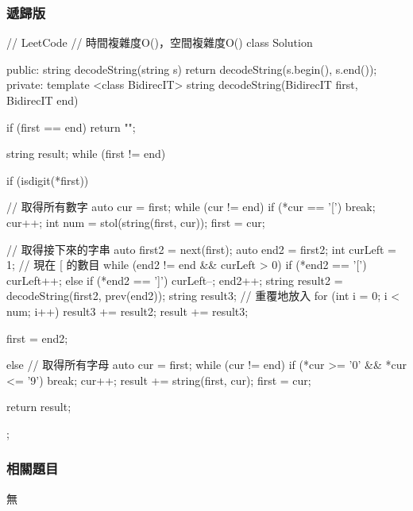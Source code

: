 \subsubsection{遞歸版}
\begin{Code}
// LeetCode
// 時間複雜度O()，空間複雜度O()
class Solution {
public:
    string decodeString(string s) {
        return decodeString(s.begin(), s.end());
    }
private:
    template <class BidirecIT>
        string decodeString(BidirecIT first, BidirecIT end)
    {
        if (first == end) return "";

        string result;
        while (first != end)
        {
            if (isdigit(*first))
            {
                // 取得所有數字
                auto cur = first;
                while (cur != end) { if (*cur == '[') break; cur++; }
                int num = stol(string(first, cur));
                first = cur;

                // 取得接下來的字串
                auto first2 = next(first);
                auto end2 = first2;
                int curLeft = 1; // 現在 [ 的數目
                while (end2 != end && curLeft > 0)
                {
                    if (*end2 == '[')
                        curLeft++;
                    else if (*end2 == ']')
                        curLeft--;
                    end2++;
                }
                string result2 = decodeString(first2, prev(end2));
                string result3;
                // 重覆地放入
                for (int i = 0; i < num; i++)
                    result3 += result2;
                result += result3;

                first = end2;
            }
            else
            {
                // 取得所有字母
                auto cur = first;
                while (cur != end) { if (*cur >= '0' && *cur <= '9') break; cur++; }
                result += string(first, cur);
                first = cur;
            }
        }
        return result;
    }
};
\end{Code}


\subsubsection{相關題目}
\begindot
\item 無
\myenddot
